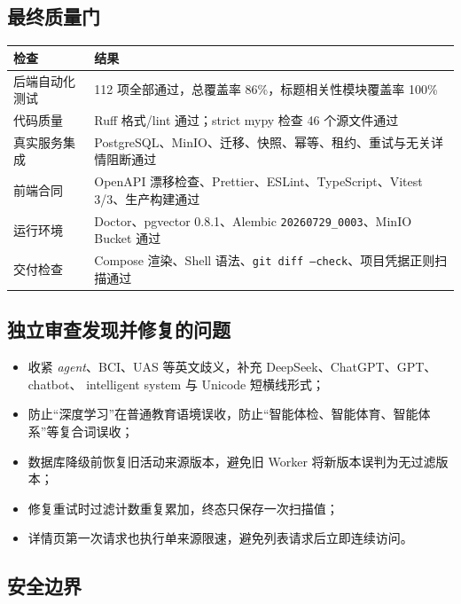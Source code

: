\documentclass[UTF8,11pt,a4paper,fontset=none]{ctexart}
\begin{document}
\subsection{最终质量门}

\noindent\begin{tabularx}{\textwidth}{L{4.0cm}Y}
\toprule
{}
\color{white}\bfseries 检查 & \color{white}\bfseries 结果 \\
\midrule
后端自动化测试 & 112 项全部通过，总覆盖率 86\%，标题相关性模块覆盖率 100\% \\
代码质量 & Ruff 格式/lint 通过；strict mypy 检查 46 个源文件通过 \\
真实服务集成 & PostgreSQL、MinIO、迁移、快照、幂等、租约、重试与无关详情阻断通过 \\
前端合同 & OpenAPI 漂移检查、Prettier、ESLint、TypeScript、Vitest 3/3、生产构建通过 \\
运行环境 & Doctor、pgvector 0.8.1、Alembic \texttt{20260729\_0003}、MinIO Bucket 通过 \\
交付检查 & Compose 渲染、Shell 语法、\texttt{git diff --check}、项目凭据正则扫描通过 \\
\bottomrule
\end{tabularx}

\subsection{独立审查发现并修复的问题}

\begin{itemize}[leftmargin=2em,itemsep=0.25em]
  \item 收紧 \textit{agent}、BCI、UAS 等英文歧义，补充 DeepSeek、ChatGPT、GPT、chatbot、
        intelligent system 与 Unicode 短横线形式；
  \item 防止“深度学习”在普通教育语境误收，防止“智能体检、智能体育、智能体系”等复合词误收；
  \item 数据库降级前恢复旧活动来源版本，避免旧 Worker 将新版本误判为无过滤版本；
  \item 修复重试时过滤计数重复累加，终态只保存一次扫描值；
  \item 详情页第一次请求也执行单来源限速，避免列表请求后立即连续访问。
\end{itemize}

\subsection{安全边界}
\end{document}
